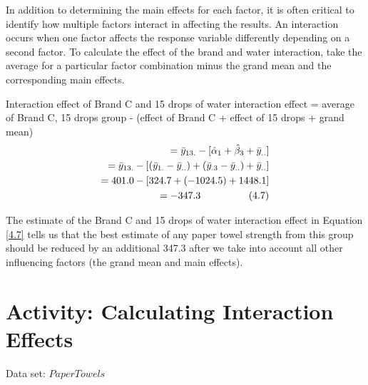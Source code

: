 \documentclass[
]{report}
\begin{document}
In addition to determining the main effects for each factor, it is often critical to identify how multiple factors interact in affecting the results. An interaction occurs when one factor affects the response variable differently depending on a second factor. To calculate the effect of the brand and water interaction, take the average for a particular factor combination minus the grand mean and the corresponding main effects.

Interaction effect of Brand C and 15 drops of water interaction effect
= average of Brand C, 15 drops group
- (effect of Brand C + effect of 15 drops + grand mean)
\begin{align}
= \bar{y}_{13.} - [\hat{\alpha}_1 + \hat{\beta}_3 + \bar{y}_{..}] \notag \\
= \bar{y}_{13.} - [(\bar{y}_{1.} - \bar{y}_{..}) + (\bar{y}_{.3} - \bar{y}_{..}) + \bar{y}_{..}] \notag \\
= 401.0 - [324.7 + (-1024.5) + 1448.1] \notag \\
= -347.3 \hspace{1cm} \tag{4.7}
\end{align}

The estimate of the Brand C and 15 drops of water interaction effect in Equation \ref{4.7} tells us that the best estimate of any paper towel strength from this group should be reduced by an additional 347.3 after we take into account all other influencing factors (the grand mean and main effects).

\hypertarget{activity-calculating-interaction-effects}{%
\section*{Activity: Calculating Interaction Effects}\label{activity-calculating-interaction-effects}}

Data set: \(PaperTowels\)
\end{document}
